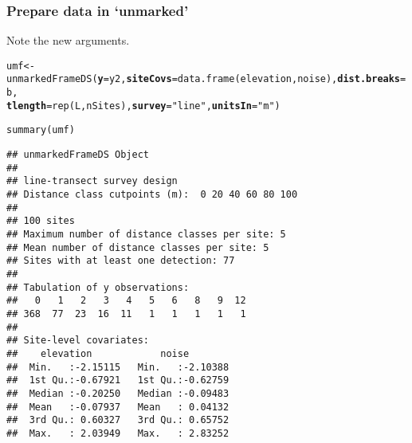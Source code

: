 \documentclass[color=usenames,dvipsnames]{beamer}\usepackage[]{graphicx}\usepackage[]{color}
\makeatletter
\newcommand{\hlstr}[1]{\textcolor[rgb]{0.749,0.012,0.012}{#1}}%
\newcommand{\hlstd}[1]{\textcolor[rgb]{0,0,0}{#1}}%
\newcommand{\hlkwb}[1]{\textcolor[rgb]{0,0.341,0.682}{#1}}%
\newcommand{\hlkwc}[1]{\textcolor[rgb]{0,0,0}{\textbf{#1}}}%
\newcommand{\hlkwd}[1]{\textcolor[rgb]{0.004,0.004,0.506}{#1}}%
\newenvironment{kframe}{%
 \def\at@end@of@kframe{}%
 \ifinner\ifhmode%
  \def\at@end@of@kframe{\end{minipage}}%
  \begin{minipage}{\columnwidth}%
 \fi\fi%
 \def\FrameCommand##1{\hskip\@totalleftmargin \hskip-\fboxsep
 \colorbox{shadecolor}{##1}\hskip-\fboxsep
     \hskip-\linewidth \hskip-\@totalleftmargin \hskip\columnwidth}%
 \MakeFramed {\advance\hsize-\width
   \@totalleftmargin\z@ \linewidth\hsize
   \@setminipage}}%
 {\par\unskip\endMakeFramed%
 \at@end@of@kframe}
\newenvironment{knitrout}{}{} %
\makeatother
\begin{document}
\begin{frame}[fragile]
  \frametitle{Prepare data in `unmarked'}
  \small
  Note the new arguments.
  \vspace{-6pt}
\begin{knitrout}\tiny
{}\color{fgcolor}\begin{kframe}
\begin{alltt}
\hlstd{umf} \hlkwb{<-} \hlkwd{unmarkedFrameDS}\hlstd{(}\hlkwc{y}\hlstd{=y2,} \hlkwc{siteCovs}\hlstd{=}\hlkwd{data.frame}\hlstd{(elevation,noise),} \hlkwc{dist.breaks}\hlstd{=b,}
                       \hlkwc{tlength}\hlstd{=}\hlkwd{rep}\hlstd{(L, nSites),} \hlkwc{survey}\hlstd{=}\hlstr{"line"}\hlstd{,} \hlkwc{unitsIn}\hlstd{=}\hlstr{"m"}\hlstd{)}
\end{alltt}
\end{kframe}
\end{knitrout}
\pause
\begin{knitrout}\tiny
{}\color{fgcolor}\begin{kframe}
\begin{alltt}
\hlkwd{summary}\hlstd{(umf)}
\end{alltt}
\begin{verbatim}
## unmarkedFrameDS Object
## 
## line-transect survey design
## Distance class cutpoints (m):  0 20 40 60 80 100 
## 
## 100 sites
## Maximum number of distance classes per site: 5 
## Mean number of distance classes per site: 5 
## Sites with at least one detection: 77 
## 
## Tabulation of y observations:
##   0   1   2   3   4   5   6   8   9  12 
## 368  77  23  16  11   1   1   1   1   1 
## 
## Site-level covariates:
##    elevation            noise         
##  Min.   :-2.15115   Min.   :-2.10388  
##  1st Qu.:-0.67921   1st Qu.:-0.62759  
##  Median :-0.20250   Median :-0.09483  
##  Mean   :-0.07937   Mean   : 0.04132  
##  3rd Qu.: 0.60327   3rd Qu.: 0.65752  
##  Max.   : 2.03949   Max.   : 2.83252
\end{verbatim}
\end{kframe}
\end{knitrout}
\end{frame}
\end{document}
